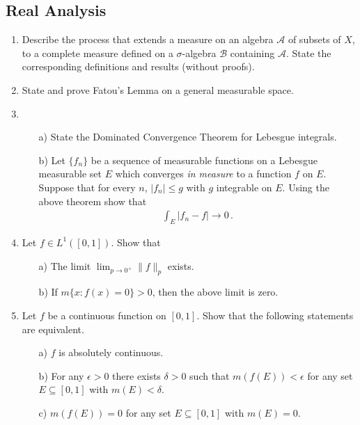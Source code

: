 \documentclass[11pt]{amsart}
\theoremstyle{plain}
\theoremstyle{definition}
\theoremstyle{remark}
\begin{document}
\subsection{Real Analysis}
\begin{enumerate}
    \item Describe the process that extends a measure on an algebra $\mathcal{A}$ of subsets of $X$, to a complete measure defined on a $\sigma$-algebra $\mathcal{B}$ containing $\mathcal{A}$. State the corresponding definitions and results (without proofs).
    
    \item State and prove Fatou's Lemma on a general measurable space.
    
    \item \begin{enumerate}
        \item[a)] State the Dominated Convergence Theorem for Lebesgue integrals.
        
        \item[b)] Let $\{f_n\}$ be a sequence of measurable functions on a Lebesgue measurable set $E$ which converges {\it in measure} to a function $f$ on $E$. Suppose that for every $n$, $|f_n| \leq g$ with $g$ integrable on $E$. Using the above theorem show that 
        \begin{align*}
            \int_E |f_n-f| \longrightarrow 0 \, .
        \end{align*}
    \end{enumerate}
    
    \item Let $f\in L^1([0,1])$. Show that
    \begin{enumerate}
        \item[a)] The limit $\lim_{p\to 0^+} \| f \|_p$ exists.
        \item[b)] If $m \{x : f(x) = 0\} > 0$, then the above limit is zero.
    \end{enumerate}
    
    \item Let $f$ be a continuous function on $[0,1]$. Show that the following statements are equivalent.
    \begin{enumerate}
        \item[a)] $f$ is absolutely continuous.
        \item[b)] For any $\epsilon > 0$ there exists $\delta > 0$ such that $m(f(E)) < \epsilon$ for any set $E\subseteq [0,1]$ with $m(E) < \delta$.
        \item[c)] $m(f(E)) = 0$ for any set $E \subseteq [0,1]$ with $m(E)=0$.
    \end{enumerate}
\end{enumerate}








\end{document}
